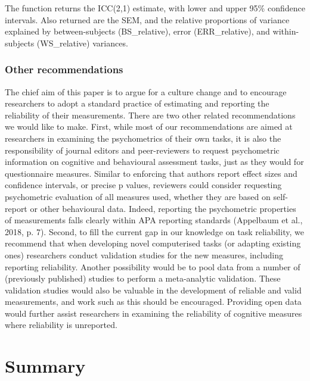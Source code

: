 \documentclass[english,,man,floatsintext]{apa6}
\begin{document}
The function returns the ICC(2,1) estimate, with lower and upper 95\% confidence intervals. Also returned are the SEM, and the relative proportions of variance explained by between-subjects (BS\_relative), error (ERR\_relative), and within-subjects (WS\_relative) variances.

\hypertarget{other-recommendations}{%
\subsubsection{Other recommendations}\label{other-recommendations}}

The chief aim of this paper is to argue for a culture change and to encourage researchers to adopt a standard practice of estimating and reporting the reliability of their measurements. There are two other related recommendations we would like to make. First, while most of our recommendations are aimed at researchers in examining the psychometrics of their own tasks, it is also the responsibility of journal editors and peer-reviewers to request psychometric information on cognitive and behavioural assessment tasks, just as they would for questionnaire measures. Similar to enforcing that authors report effect sizes and confidence intervals, or precise p values, reviewers could consider requesting psychometric evaluation of all measures used, whether they are based on self-report or other behavioural data. Indeed, reporting the psychometric properties of measurements falls clearly within APA reporting standards (Appelbaum et al., 2018, p. 7). Second, to fill the current gap in our knowledge on task reliability, we recommend that when developing novel computerised tasks (or adapting existing ones) researchers conduct validation studies for the new measures, including reporting reliability. Another possibility would be to pool data from a number of (previously published) studies to perform a meta-analytic validation. These validation studies would also be valuable in the development of reliable and valid measurements, and work such as this should be encouraged. Providing open data would further assist researchers in examining the reliability of cognitive measures where reliability is unreported.

\hypertarget{summary}{%
\section{Summary}\label{summary}}
\end{document}

